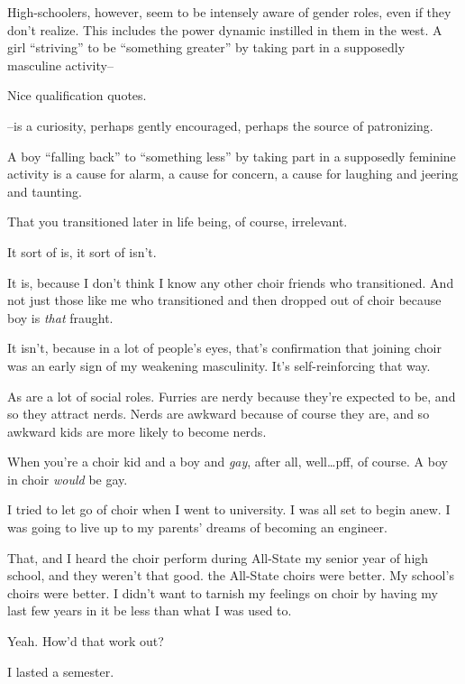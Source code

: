 \begin{leftcolumn}
High-schoolers, however, seem to be intensely aware of gender roles, even if they don't realize. This includes the power dynamic instilled in them in the west. A girl ``striving'' to be ``something greater'' by taking part in a supposedly masculine activity--

\begin{ally}
Nice qualification quotes.
\end{ally}
--is a curiosity, perhaps gently encouraged, perhaps the source of patronizing.

A boy ``falling back'' to ``something less'' by taking part in a supposedly feminine activity is a cause for alarm, a cause for concern, a cause for laughing and jeering and taunting.

\begin{ally}
That you transitioned later in life being, of course, irrelevant.
\end{ally}
It sort of is, it sort of isn't.

It is, because I don't think I know any other choir friends who transitioned. And not just those like me who transitioned and then dropped out of choir because boy is \emph{that} fraught.

It isn't, because in a lot of people's eyes, that's confirmation that joining choir was an early sign of my weakening masculinity. It's self-reinforcing that way.

\begin{ally}
As are a lot of social roles. Furries are nerdy because they're expected to be, and so they attract nerds. Nerds are awkward because of course they are, and so awkward kids are more likely to become nerds.
\end{ally}
When you're a choir kid and a boy and \emph{gay}, after all, well\ldots{}pff, of course. A boy in choir \emph{would} be gay.
\newpage

I tried to let go of choir when I went to university. I was all set to begin anew. I was going to live up to my parents' dreams of becoming an engineer.

That, and I heard the choir perform during All-State my senior year of high school, and they weren't that good. the All-State choirs were better. My school's choirs were better. I didn't want to tarnish my feelings on choir by having my last few years in it be less than what I was used to.

\begin{ally}
Yeah. How'd that work out?
\end{ally}
I lasted a semester.


\end{leftcolumn}
